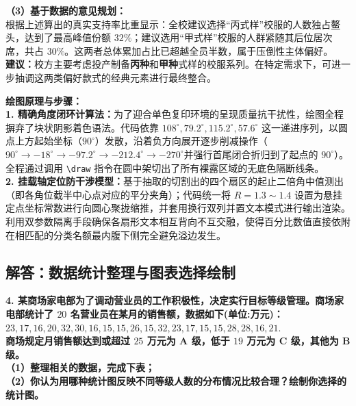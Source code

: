 \vspace{0.4cm}

\textbf{（3）基于数据的意见规划：} \\
根据上述算出的真实支持率比重显示：全校建议选择“丙式样”校服的人数独占鳌头，达到了最高峰值份额 $32\%$；建议选用“甲式样”校服的人群紧随其后位居次席，共占 $30\%$。这两者总体累加占比已超越全员半数，属于压倒性主体偏好。\\
\textbf{建议：}校方主要考虑投产制备\textbf{丙种}和\textbf{甲种}式样的校服系列。在特定需求下，可进一步抽调这两类偏好款式的经典元素进行最终整合。

\vspace{0.6cm}

{\small\color{blue!70!black}
\textbf{绘图原理与步骤：}\\
\textbf{1. 精确角度闭环计算法：}为了迎合单色复印环境的呈现质量抗干扰性，绘图全程摒弃了块状阴影着色语法。代码依靠 $108^\circ, 79.2^\circ, 115.2^\circ, 57.6^\circ$ 这一递进序列，以圆点上方起始坐标（$90^\circ$）发散，沿着负方向展开逐步削减操作（$90^\circ \to -18^\circ \to -97.2^\circ \to -212.4^\circ \to -270^\circ$并强行首尾闭合折归到了起点的 $90^\circ$）。全程通过调用 \texttt{\textbackslash draw} 指令在圆中架切出了所有裸露区域的无底色隔断线条。\\
\textbf{2. 挂载轴定位防干涉模型：}基于抽取的切割出的四个扇区的起止二倍角中值测出（即各角位截半中心点对应的平分夹角）；代码统一将 $R=1.3 \sim 1.4$ 设置为悬挂定点坐标常数进行向圆心聚拢缩推，并套用换行双列并置文本模式进行输出渲染。利用双参数隔离手段确保各扇形文本相互背向不互交融，使得百分比数值直接依附在相匹配的分类名额最内腹下侧完全避免溢边发生。
}

\newpage

\newpage

\subsection{解答：数据统计整理与图表选择绘制}

\vspace{0.6cm}

\textbf{4. 某商场家电部为了调动营业员的工作积极性，决定实行目标等级管理。商场家电部统计了 $20$ 名营业员在某月的销售额，数据如下(单位:万元)：}\\
$23,17,16,20,32,30,16,15,15,26,15,32,23,17,15,15,28,28,16,21.$\\
\textbf{商场规定月销售额达到或超过 $25$ 万元为 A 级，低于 $19$ 万元为 C 级，其他为 B 级。}\\
\textbf{（1）整理相关的数据，完成下表；}\\
\textbf{（2）你认为用哪种统计图反映不同等级人数的分布情况比较合理？绘制你选择的统计图。}

